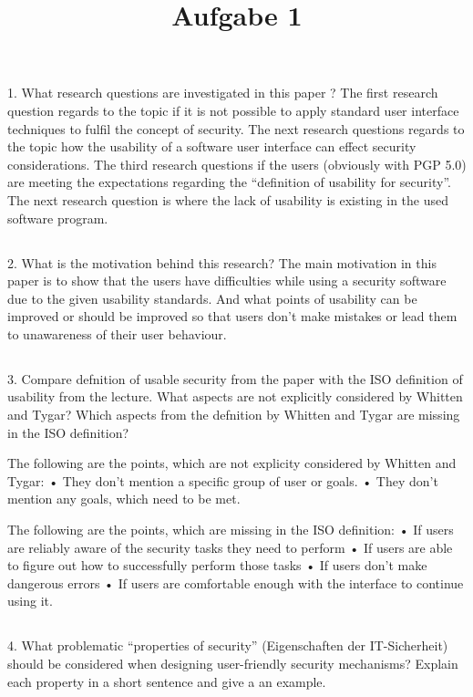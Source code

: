 \title{Aufgabe 1}

\subsection{}
1. What research questions are investigated in this paper ? 
The first research question regards to the topic if it is not possible to apply standard user interface techniques to fulfil the concept of security. 
The next research questions regards to the topic how the usability of a software user interface can effect security considerations. 
The third research questions if the users (obviously with PGP 5.0) are meeting the expectations regarding the “definition of usability for security”. 
The next research question is where the lack of usability is existing in the used software program. 


\subsection{}
2. What is the motivation behind this research? 
The main motivation in this paper is to show that the users have difficulties while using a security software due to the given usability standards. And what points of usability can be improved or should be improved so that users don’t make mistakes or lead them to unawareness of their user behaviour. 

\subsection{}
3. Compare defnition of usable security from the paper with the ISO definition of
usability from the lecture. What aspects are not explicitly considered by Whitten
and Tygar? Which aspects from the defnition by Whitten and Tygar are missing in
the ISO definition?

The following are the points, which are not explicity considered by Whitten and Tygar: 
•	They don’t mention a specific group of user or goals.
•	They don’t mention any goals, which need to be met. 

The following are the points, which are missing in the ISO definition:
•	If users are reliably aware of the security tasks they need to perform
•	If users are able to figure out how to successfully perform those tasks 
•	If users don’t make dangerous errors 
•	If users are comfortable enough with the interface to continue using it. 

\subsection{}
4. What problematic “properties of security” (Eigenschaften der IT-Sicherheit) should be considered when designing user-friendly security mechanisms? Explain each property in a short sentence and give a an example. 

